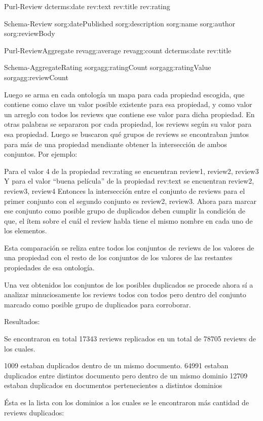 Purl-Review
dcterms:date
rev:text
rev:title
rev:rating

Schema-Review
sorg:datePublished
sorg:description
sorg:name
sorg:author
sorg:reviewBody

Purl-ReviewAggregate
revagg:average
revagg:count
dcterms:date
rev:title

Schema-AggregateRating
sorgagg:ratingCount
sorgagg:ratingValue
sorgagg:reviewCount

Luego se arma en cada ontología un mapa para cada propiedad escogida, que contiene como clave un valor posible existente para esa propiedad, y 
como valor un arreglo con todos los reviews que contiene ese valor para dicha propiedad.
En otras palabras se separaron por cada propiedad, los reviews según su valor para esa propiedad.
Luego se buscaron qué grupos de reviews se encontraban juntos para más de una propiedad mendiante obtener la intersección de ambos conjuntos. Por ejemplo:

Para el valor 4 de la propiedad rev:rating se encuentran {review1, review2, review3}
Y para el valor ``buena película'' de la propiedad rev:text se encuentran {review2, review3, review4}
Entonces la intersección entre el conjunto de reviews para el primer conjunto con el segundo conjunto es {review2, review3}.
Ahora para marcar ese conjunto como posible grupo de duplicados deben cumplir la condición de que, el ítem sobre el cuál el review habla
tiene el mismo nombre en cada uno de los elementos.

Esta comparación se reliza entre todos los conjuntos de reviews de los valores de una propiedad con el resto de los conjuntos de los valores de las restantes propiedades de esa ontología.

Una vez obtenidos los conjuntos de los posibles duplicados se procede ahora sí a analizar minuciosamente los reviews todos con todos pero dentro del conjunto marcado como posible grupo de duplicados
para corroborar.

Resultados:

Se encontraron en total 17343 reviews replicados en un total de 78705 reviews de los cuales.

1009 estaban duplicados dentro de un mismo documento.
64991 estaban duplicados entre distintos documento pero dentro de un mismo dominio
12709 estaban duplicados en documentos pertenecientes a distintos dominios

Ésta es la lista con los dominios a los cuales se le encontraron más cantidad de reviews duplicados:


